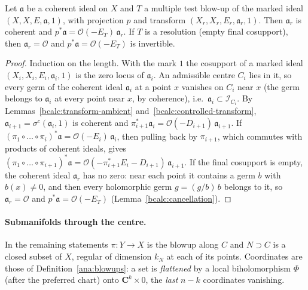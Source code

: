 \begin{proposition}
\label{bcalc:principalization}
\mixedleanok
Let \(\mathfrak a\) be a coherent ideal on \(X\) and \(T\) a multiple test blow-up of the marked ideal \((X,X,E,\mathfrak a,1)\), with
projection \(p\) and transform \((X_r,X_r,E_r,\mathfrak a_r,1)\). Then \(\mathfrak a_r\) is coherent and
\(p^*\mathfrak a=\mathcal O(-E_T)\,\mathfrak a_r\). If \(T\) is a resolution (empty final cosupport), then \(\mathfrak a_r=\mathcal O\)
and \(p^*\mathfrak a=\mathcal O(-E_T)\) is invertible.
\end{proposition}
\begin{proof}
\mixedleanok
Induction on the length. With the mark \(1\) the cosupport of a marked ideal \((X_i,X_i,E_i,\mathfrak a_i,1)\) is the zero locus of
\(\mathfrak a_i\). An admissible centre \(C_i\) lies in it, so every germ of the coherent ideal \(\mathfrak a_i\) at a point \(x\)
vanishes on \(C_i\) near \(x\) (the germ belongs to \(\mathfrak a_i\) at every point near \(x\), by coherence), i.e.\
\(\mathfrak a_i\subset\mathcal I_{C_i}\). By Lemmas~\ref{bcalc:transform-ambient} and~\ref{bcalc:controlled-transform},
\(\mathfrak a_{i+1}=\sigma^{c}(\mathfrak a_i,1)\) is coherent and \(\pi_{i+1}^*\mathfrak a_i=\mathcal O(-D_{i+1})\,\mathfrak a_{i+1}\).
If \((\pi_1\circ\dots\circ\pi_i)^*\mathfrak a=\mathcal O(-E_i)\,\mathfrak a_i\), then pulling back by \(\pi_{i+1}\), which commutes with
products of coherent ideals, gives \((\pi_1\circ\dots\circ\pi_{i+1})^*\mathfrak a=\mathcal O(-\pi_{i+1}^*E_i-D_{i+1})\,\mathfrak a_{i+1}\).
If the final cosupport is empty, the coherent ideal \(\mathfrak a_r\) has no zero: near each point it contains a germ \(b\) with
\(b(x)\ne0\), and then every holomorphic germ \(g=(g/b)\,b\) belongs to it, so \(\mathfrak a_r=\mathcal O\) and
\(p^*\mathfrak a=\mathcal O(-E_T)\) (Lemma~\ref{bcalc:cancellation}).
\end{proof}

\paragraph{Submanifolds through the centre.} In the remaining statements \(\pi\colon Y\to X\) is the blowup along \(C\) and
\(N\supset C\) is a closed subset of \(X\), regular of dimension \(k_N\) at each of its points. Coordinates are those of
Definition~\ref{ana:blowups}: a set is \emph{flattened} by a local biholomorphism \(\Phi\) (after the preferred chart) onto
\(\mathbf C^k\times0\), the \emph{last} \(n-k\) coordinates vanishing.

